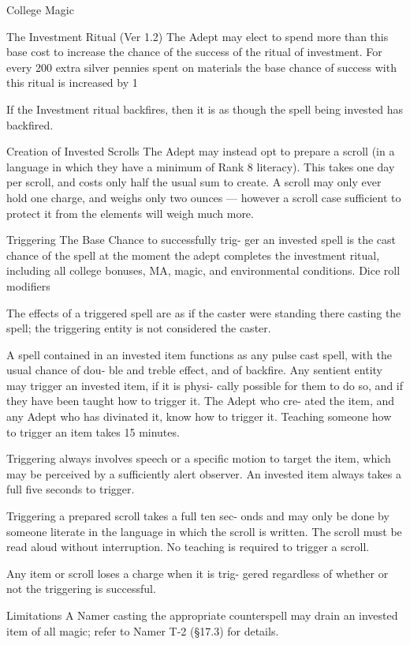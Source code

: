\begin{Chapter}{College Magic}
\begin{ritual}{The Investment Ritual (Ver 1.2)}
The  Adept may elect to spend more than this base 
cost  to  increase  the  chance  of  the  success  of  the 
ritual  of  investment.  For  every  200  extra  silver 
pennies  spent  on  materials  the  base  chance  of 
success with this ritual is increased by 1%

If  the  Investment  ritual  backfires,  then  it  is  as 
though the spell being invested has backfired. 

Creation  of  Invested  Scrolls  The  Adept  may 
instead  opt  to  prepare  a  scroll  (in  a  language  in 
which  they  have  a  minimum  of  Rank  8  literacy). 
This  takes  one  day  per  scroll,  and  costs  only  half 
the  usual  sum  to  create.  A  scroll  may  only  ever 
hold  one  charge,  and  weighs  only  two  ounces  — 
however  a  scroll  case  sufficient  to  protect  it  from 
the elements will weigh much more. 

Triggering  The  Base  Chance  to  successfully  trig-
ger an invested spell is the cast chance of the spell 
at the  moment the  adept  completes  the  investment 
ritual,  including  all  college  bonuses,  MA,  magic, 
and  environmental  conditions.  Dice  roll  modifiers 

The  effects  of  a  triggered  spell  are  as  if  the  caster 
were standing there casting the spell; the triggering 
entity is not considered the caster. 

A  spell  contained in  an  invested  item functions  as 
any pulse cast spell, with the usual chance of dou-
ble and treble effect, and of backfire. Any sentient 
entity  may  trigger  an  invested  item,  if  it  is  physi-
cally  possible  for  them  to  do  so,  and  if  they  have 
been taught how to trigger it. The  Adept who cre-
ated the item, and any Adept who has divinated it, 
know  how  to  trigger  it.  Teaching  someone  how  to 
trigger an item takes 15 minutes. 

Triggering  always  involves  speech  or  a  specific 
motion to target the item, which may be perceived 
by  a  sufficiently  alert  observer.  An  invested  item 
always takes a full five seconds to trigger. 

Triggering  a  prepared  scroll  takes  a  full  ten  sec-
onds and may only be done by someone literate in 
the  language  in  which  the  scroll  is  written.  The 
scroll  must be  read aloud  without interruption.  No 
teaching is required to trigger a scroll. 

Any  item  or  scroll  loses  a  charge  when  it  is  trig-
gered regardless of whether or not the triggering is 
successful. 

Limitations  A  Namer  casting  the  appropriate 
counterspell  may  drain  an  invested  item  of  all 
magic; refer to Namer T-2 (§17.3) for details. 
\end{ritual}

\end{Chapter}

